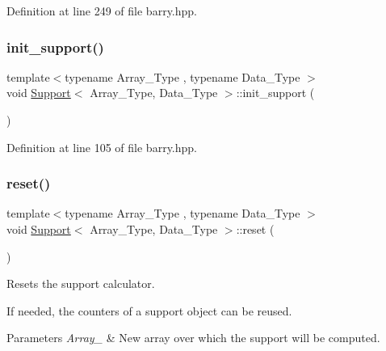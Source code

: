 Definition at line 249 of file barry.\+hpp.

\mbox{\label{classbarry_1_1_support_aef6fda6e7a0989f53fcd252609d770c9}} 
\subsubsection{\texorpdfstring{init\+\_\+support()}{init\_support()}}
{\footnotesize\ttfamily template$<$typename Array\+\_\+\+Type , typename Data\+\_\+\+Type $>$ \\
void \hyperlink{classbarry_1_1_support}{Support}$<$ Array\+\_\+\+Type, Data\+\_\+\+Type $>$\+::init\+\_\+support (\begin{DoxyParamCaption}{ }\end{DoxyParamCaption})\hspace{0.3cm}{\ttfamily [inline]}}



Definition at line 105 of file barry.\+hpp.

\mbox{\label{classbarry_1_1_support_a5878ac60282fc1380c92f3ba502f249e}} 
\subsubsection{\texorpdfstring{reset()}{reset()}\hspace{0.1cm}{\footnotesize\ttfamily [1/2]}}
{\footnotesize\ttfamily template$<$typename Array\+\_\+\+Type , typename Data\+\_\+\+Type $>$ \\
void \hyperlink{classbarry_1_1_support}{Support}$<$ Array\+\_\+\+Type, Data\+\_\+\+Type $>$\+::reset (\begin{DoxyParamCaption}{ }\end{DoxyParamCaption})\hspace{0.3cm}{\ttfamily [inline]}}



Resets the support calculator. 

If needed, the counters of a support object can be reused.


\begin{DoxyParams}{Parameters}
{\em Array\+\_\+} & New array over which the support will be computed. \\
\hline
\end{DoxyParams}


